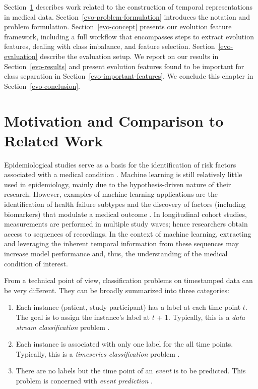 \documentclass[
  oneside]{book}
\providecommand{\tightlist}{%
  \setlength{\itemsep}{0pt}\setlength{\parskip}{0pt}}
\begin{document}
Section~\ref{evo-intro} describes work related to the construction of temporal representations in medical data.
Section~\ref{evo-problem-formulation} introduces the notation and problem formulation.
Section~\ref{evo-concept} presents our evolution feature framework, including a full workflow that encompasses steps to extract evolution features, dealing with class imbalance, and feature selection.
Section~\ref{evo-evaluation} describe the evaluation setup.
We report on our results in Section~\ref{evo-results} and present evolution features found to be important for class separation in Section~\ref{evo-important-features}.
We conclude this chapter in Section~\ref{evo-conclusion}.

\hypertarget{evo-intro}{%
\section{Motivation and Comparison to Related Work}\label{evo-intro}}

Epidemiological studies serve as a basis for the identification of risk factors associated with a medical condition \autocite{guo2020diabetes,boehme2017stroke,oliver2020causes}.
Machine learning is still relatively little used in epidemiology, mainly due to the hypothesis-driven nature of their research.
However, examples of machine learning applications are the identification of health failure subtypes \autocite{austin2013using} and the discovery of factors (including biomarkers) that modulate a medical outcome \autocite{Raju2014,valavanis2013derivation}.
In longitudinal cohort studies, measurements are performed in multiple study waves; hence researchers obtain access to sequences of recordings.
In the context of machine learning, extracting and leveraging the inherent temporal information from these sequences may increase model performance and, thus, the understanding of the medical condition of interest.

From a technical point of view, classification problems on timestamped data can be very different.
They can be broadly summarized into three categories:

\begin{enumerate}
\def\labelenumi{\alph{enumi}.}
\tightlist
\item
  Each instance (patient, study participant) has a label at each time point \(t\). The goal is to assign the instance's label at \(t\) + 1. Typically, this is a \emph{data stream classification} problem \autocite{unnikrishnan2020entity,aggarwal2014survey}.
\item
  Each instance is associated with only one label for the all time points. Typically, this is a \emph{timeseries classification} problem \autocite{fawaz2019deep,hyndman2018forecasting}.
\item
  There are no labels but the time point of an \emph{event} is to be predicted. This problem is concerned with \emph{event prediction} \autocite{zhao2019learning,bagattini2019classification,beunza2019comparison}.
\end{enumerate}
\end{document}

